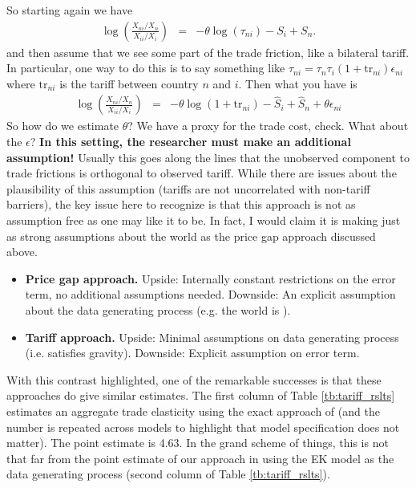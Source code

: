 \documentclass[pdftex,12pt]{article}
\begin{document}
So starting again we have
\begin{eqnarray}
\displaystyle \log\left(\frac{X_{ni}/X_n}{X_{ii}/X_i}\right)&=&-\theta \log\left(\tau_{ni}\right) -  S_i +  S_n.
\end{eqnarray}
and then assume that we see some part of the trade friction, like a bilateral tariff. In particular, one way to do this is to say something like $\tau_{ni} = \tau_n \tau_i (1+ \mbox{tr}_{ni}) \epsilon_{ni}$ where $\mbox{tr}_{ni}$ is the tariff between country $n$ and $i$. Then what you have is
\begin{eqnarray}
\displaystyle \log\left(\frac{X_{ni}/X_n}{X_{ii}/X_i}\right)&=&-\theta \log\left(1+ \mbox{tr}_{ni} \right) -  \hat S_i +  \hat S_n + \theta \epsilon_{ni}
\end{eqnarray}
So how do we estimate $\theta$? We have a proxy for the trade cost, check. What about the $\epsilon$? \textbf{In this setting, the researcher must make an additional assumption!} Usually this goes along the lines that the unobserved component to trade frictions is orthogonal to observed tariff. While there are issues about the plausibility of this assumption (tariffs are not uncorrelated with non-tariff barriers), the key issue here to recognize is that this approach is not as assumption free as one may like it to be. In fact, I would claim it is making just as strong assumptions about the world as the price gap approach discussed above.
\begin{itemize}
\item \textbf{Price gap approach.} Upside: Internally constant restrictions on the error term, no additional assumptions needed. Downside: An explicit assumption about the data generating process (e.g. the world is \citet{eaton2002technology}).
\item \textbf{Tariff approach.} Upside: Minimal assumptions on data generating process (i.e. satisfies gravity). Downside: Explicit assumption on error term.

\end{itemize}
With this contrast highlighted, one of the remarkable successes is that these approaches do give similar estimates.  The first column of Table \ref{tb:tariff_rslts} estimates an aggregate trade elasticity using the exact approach of \citet{caliendo2014estimates} (and the number is repeated across models to highlight that model specification does not matter). The point estimate is 4.63. In the grand scheme of things, this is not that far from the point estimate of our approach in \citet{simonovska2014trade} using the EK model as the data generating process (second column of Table \ref{tb:tariff_rslts}).
\end{document}
